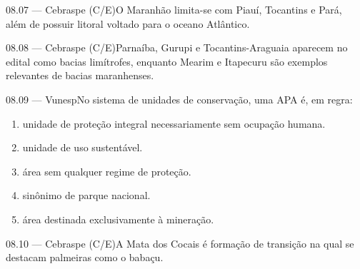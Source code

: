 \begin{questao}{ 08.07 — Cebraspe (C/E)}O Maranhão limita-se com Piauí, Tocantins e Pará, além de possuir litoral voltado para o oceano Atlântico.\end{questao}
\begin{questao}{ 08.08 — Cebraspe (C/E)}Parnaíba, Gurupi e Tocantins-Araguaia aparecem no edital como bacias limítrofes, enquanto Mearim e Itapecuru são exemplos relevantes de bacias maranhenses.\end{questao}
\begin{questao}{ 08.09 — Vunesp}No sistema de unidades de conservação, uma APA é, em regra:\begin{enumerate}[label=\Alph*)]\item unidade de proteção integral necessariamente sem ocupação humana.\item unidade de uso sustentável.\item área sem qualquer regime de proteção.\item sinônimo de parque nacional.\item área destinada exclusivamente à mineração.\end{enumerate}\end{questao}
\begin{questao}{ 08.10 — Cebraspe (C/E)}A Mata dos Cocais é formação de transição na qual se destacam palmeiras como o babaçu.\end{questao}

